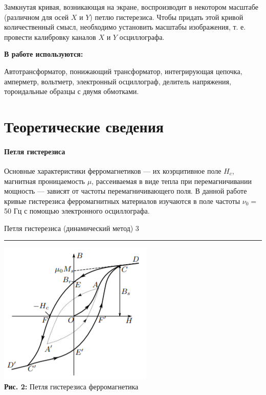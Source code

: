 \documentclass[12pt,a4paper]{scrartcl}
\begin{document}
	Замкнутая кривая, возникающая на экране, воспроизводит в неко­тором масштабе (различном для осей $X$ и $Y$) 		петлю гистерезиса. Что­бы придать этой кривой количественный смысл, необходимо установить масштабы 				изображения, т. е. провести калибровку каналов $X$ и $Y$ осцил­лографа.

	\textbf{В работе используются:}
	
	Автотрансформатор, понижающий трансформатор, интегрирующая цепочка, амперметр, вольтметр, электронный 			осциллограф, делитель напряжения, тороидальные образцы с двумя обмотками.

	\section{Теоретические сведения}

	\paragraph{Петля гистерезиса} \hfill
	
	Основные характеристики
ферромагнетиков — их коэрцитивное поле $H_c$, магнитная проницаемость
$\mu$, рассеиваемая в виде тепла при перемагничивании мощность — зависят
от частоты перемагничивающего поля. В данной работе кривые гистерезиса ферромагнитных материалов изучаются в поле частоты $\nu_0 =$ 50 Гц
с помощью электронного осциллографа.

	\newpage


	\begin{flushleft}
		\footnotesize{Петля гистерезиса (динамический метод)} \hspace{\fill} \footnotesize{3}
		\\[-0.3cm]\noindent\rule{\textwidth}{0.3pt}
	\end{flushleft}	
		
	\begin{center}
		\includegraphics[scale=0.8]{PIC_2.png}
		\\\textbf{Рис. 2: } Петля гистерезиса ферромагнетика
	\end{center}
	
\end{document}
